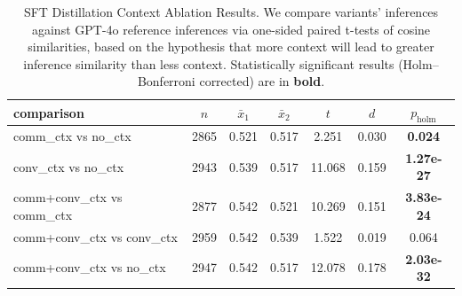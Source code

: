 \begin{table}[h]
\centering
\small
\begin{tabular}{lcccccc}
\toprule
comparison & $n$ & $\bar{x}_1$ & $\bar{x}_2$ & $t$ & $d$ & $p_{\text{holm}}$ \\
\midrule
    comm\_ctx vs no\_ctx & 2865 & 0.521 & 0.517 & 2.251 & 0.030 & \textbf{0.024} \\
    conv\_ctx vs no\_ctx & 2943 & 0.539 & 0.517 & 11.068 & 0.159 & \textbf{1.27e-27} \\
    comm+conv\_ctx vs comm\_ctx & 2877 & 0.542 & 0.521 & 10.269 & 0.151 & \textbf{3.83e-24} \\
    comm+conv\_ctx vs conv\_ctx & 2959 & 0.542 & 0.539 & 1.522 & 0.019 & 0.064 \\
    comm+conv\_ctx vs no\_ctx & 2947 & 0.542 & 0.517 & 12.078 & 0.178 & \textbf{2.03e-32} \\
\bottomrule
\end{tabular}
\caption{\ssfGenerator SFT Distillation Context Ablation Results. We compare \ssfGenerator variants' inferences against GPT-4o reference inferences via one-sided paired t-tests of cosine similarities, based on the hypothesis that more context will lead to greater inference similarity than less context. Statistically significant results (Holm–Bonferroni corrected) are in \textbf{bold}.}
\label{tab:ablation_ttests}
\end{table}
